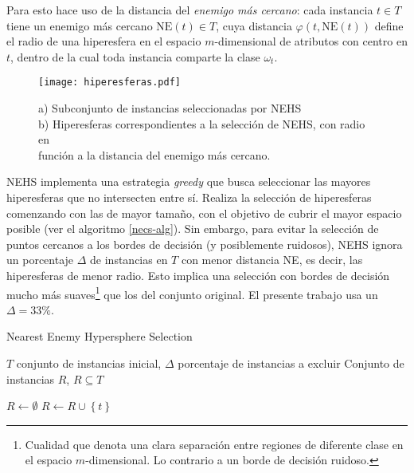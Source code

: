 Para esto hace uso de la distancia del \emph{enemigo más cercano}: cada instancia $t \in T$ tiene un enemigo más cercano $\mathrm{NE}(t) \in T$, cuya distancia $\varphi(t,\mathrm{NE}(t))$ define el radio de una hiperesfera en el espacio $m$-dimensional de atributos con centro en $t$, dentro de la cual toda instancia comparte la clase $\omega_t$.

\begin{figure}[h!]
\centering
\texttt{[image: hiperesferas.pdf]}
\caption[Selección obtenida por NEHS]{a) Subconjunto de instancias seleccionadas por NEHS \\b) Hiperesferas correspondientes a la selección de NEHS, con radio en\\función a la distancia del enemigo más cercano.}
\label{seleccion}
\end{figure}

NEHS implementa una estrategia \emph{greedy} que busca seleccionar las mayores hiperesferas que no intersecten entre sí. Realiza la selección de hiperesferas comenzando con las de mayor tamaño, con el objetivo de cubrir el mayor espacio posible (ver el algoritmo \ref{necs-alg}). Sin embargo, para evitar la selección de puntos cercanos a los bordes de decisión (y posiblemente ruidosos), NEHS ignora un porcentaje $\Delta$ de instancias en $T$ con menor distancia NE, es decir, las hiperesferas de menor radio. Esto implica una selección con bordes de decisión mucho más suaves\footnote{Cualidad que denota una clara separación entre regiones de diferente clase en el espacio $m$-dimensional. Lo contrario a un borde de decisión ruidoso.} que los del conjunto original. El presente trabajo usa un $\Delta = 33\%$.

\begin{algorithm}
\caption{Nearest Enemy Hypersphere Selection}
\label{necs-alg}
\begin{algorithmic}[1]

\Require $T$ conjunto de instancias inicial, $\Delta$ porcentaje de instancias a excluir
\Ensure Conjunto de instancias $R$, $R \subseteq T$

\State $R \gets \emptyset$
		\State $R \gets R \cup \left\lbrace t \right\rbrace$
	\EndIf
\EndFor
\State {}
\end{algorithmic}
\end{algorithm}

